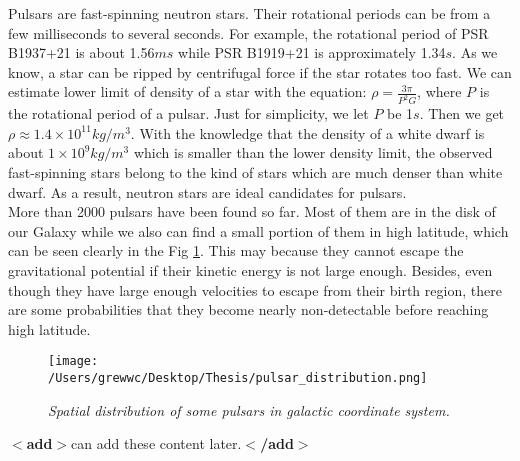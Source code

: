 \documentclass[12pt]{report}
\newcommand{\add}[1]{
  $<$\textbf{add}$>$#1$<$\textbf{/add}$>$
}
\begin{document}
        Pulsars are fast-spinning neutron stars. Their rotational periods can be from a few 
        milliseconds
        to several seconds. For example, the rotational period of PSR B1937+21 is about 1.56$ms$ while 
        PSR B1919+21 is approximately 1.34$s$. As we know, a star can be ripped by centrifugal force if the
        star rotates too fast. We can estimate lower limit of density of a star with the equation: 
        $\rho=\frac{3\pi}{P^2G}$, where $P$ is the rotational period of a pulsar. Just for simplicity, we
        let $P$ be 1$s$. Then we get $\rho\approx 1.4\times 10^{11}kg/m^3$. With the knowledge  that the 
        density of a white dwarf is about $1\times 10^9kg/m^3$ which is smaller than the lower density limit,
        the observed fast-spinning stars belong to the kind of stars which are much denser 
        than white dwarf. As a result, neutron stars are ideal candidates for pulsars. \\
        \indent
        More than 2000 pulsars have been found so far. Most of them are in the disk of our Galaxy while we also can 
        find a small portion of them in high latitude, which can be seen clearly in the Fig 
        \ref{fig: spatial_distribution}. This may 
        because they cannot escape the gravitational potential if their kinetic energy is not large enough. Besides,
        even though they have large enough velocities to escape from their birth region, there are some 
        probabilities that they become nearly non-detectable before reaching high latitude. 

        \begin{figure}[h]
          \centering
          \texttt{[image: /Users/grewwc/Desktop/Thesis/pulsar\_distribution.png]}
          \caption{\textit{\footnotesize Spatial distribution of some pulsars in galactic coordinate system.}}
          \label{fig: spatial_distribution}
        \end{figure}
        


        \add{can add these content later.}

\end{document}

